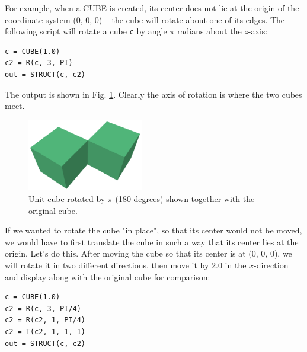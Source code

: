 For example, when a CUBE is created, its center does not lie
at the origin of the coordinate system (0, 0, 0) -- the cube will 
rotate about one of its edges. The following script will rotate 
a cube {\tt c} by angle $\pi$ radians about the $z$-axis: \\

\begin{bbox}
\begin{verbatim}
c = CUBE(1.0)
c2 = R(c, 3, PI)
out = STRUCT(c, c2)
\end{verbatim}
\end{bbox}
\vspace{6mm}

\noindent
The output is shown in Fig. \ref{fig:rot-1}. Clearly the axis of 
rotation is where the two cubes meet.
\newpage

\begin{figure}[!ht]
\begin{center}
\includegraphics[width=0.45\textwidth]{img/rot-1.png}
\end{center}
\vspace{-4mm}
\caption{Unit cube rotated by $\pi$ (180 degrees) shown together with the original cube.}
\label{fig:rot-1}
\end{figure}
\noindent
If we wanted to 
rotate the cube "in place", so that its center would not be moved,
we would have to first translate the cube in such a way that its center
lies at the origin. Let's do this. After moving the cube so that 
its center is at (0, 0, 0), we will rotate it in two different directions,
then move it by 2.0 in the $x$-direction and display along with 
the original cube for comparison:\\

\begin{bbox}
\begin{verbatim}
c = CUBE(1.0)
c2 = R(c, 3, PI/4)
c2 = R(c2, 1, PI/4)
c2 = T(c2, 1, 1, 1)
out = STRUCT(c, c2)
\end{verbatim}
\end{bbox}
\vspace{6mm}

